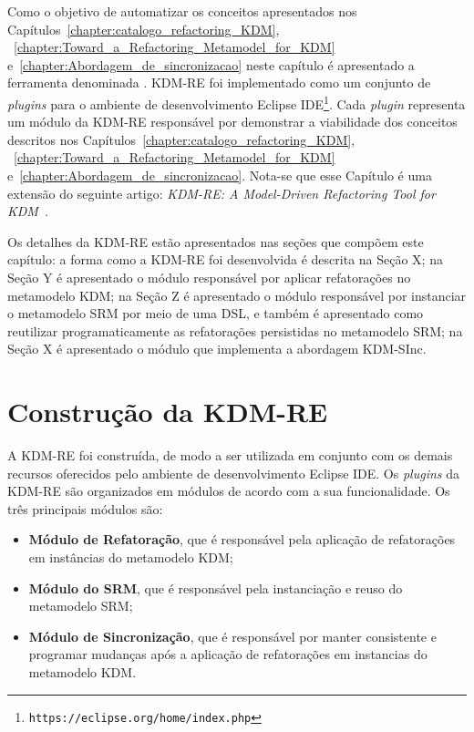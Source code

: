 Como o objetivo de automatizar os conceitos apresentados nos Capítulos~\ref{chapter:catalogo_refactoring_KDM}, ~\ref{chapter:Toward_a_Refactoring_Metamodel_for_KDM} e~\ref{chapter:Abordagem_de_sincronizacao} neste capítulo é apresentado a ferramenta denominada . KDM-RE foi implementado como um conjunto de \textit{plugins} para o ambiente de desenvolvimento Eclipse IDE\footnote{\texttt{https://eclipse.org/home/index.php}}. Cada \textit{plugin} representa um módulo da KDM-RE responsável por demonstrar a viabilidade dos conceitos descritos nos Capítulos~\ref{chapter:catalogo_refactoring_KDM}, ~\ref{chapter:Toward_a_Refactoring_Metamodel_for_KDM} e~\ref{chapter:Abordagem_de_sincronizacao}.  Nota-se que esse Capítulo é uma extensão do seguinte artigo: \textit{KDM-RE: A Model-Driven Refactoring Tool for KDM}~\cite{durelli_VEM_ferramenta}.

Os detalhes da KDM-RE estão apresentados nas seções que compõem este capítulo: a forma como a KDM-RE foi desenvolvida é descrita na Seção X; na Seção Y é apresentado o módulo responsável por aplicar refatorações no metamodelo KDM; na Seção Z é apresentado o módulo responsável por instanciar o metamodelo SRM por meio de uma DSL, e também é apresentado como reutilizar programaticamente as refatorações persistidas no metamodelo SRM; na Seção X é apresentado o módulo que implementa a abordagem KDM-SInc.



\section{Construção da KDM-RE}

A KDM-RE foi construída, de modo a ser utilizada em conjunto com os demais recursos oferecidos pelo ambiente de desenvolvimento Eclipse IDE. Os \textit{plugins} da KDM-RE são organizados em módulos de acordo com a sua funcionalidade. Os três principais módulos são:

\begin{itemize}
\item \textbf{Módulo de Refatoração}, que é responsável pela aplicação de refatorações em instâncias do metamodelo KDM;
\item \textbf{Módulo do SRM}, que é responsável pela instanciação e reuso do metamodelo SRM;
\item \textbf{Módulo de Sincronização}, que é responsável por manter consistente e programar mudanças após a aplicação de refatorações em instancias do metamodelo KDM.

\end{itemize}

